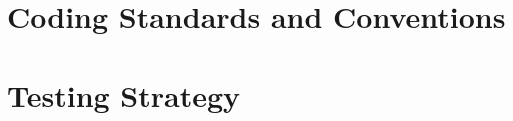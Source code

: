 \documentclass[a4paper,twoside]{sapthesis}
\begin{document}
\section{Coding Standards and Conventions}
\label{sec:coding-standards}

\section{Testing Strategy}
\label{sec:testing}
\end{document}
